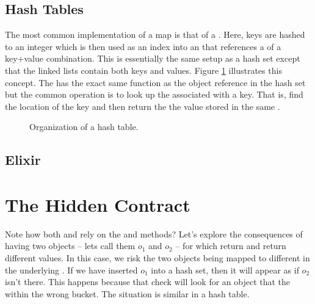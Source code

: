 \subsection{Hash Tables}

The most common implementation of a map is that of a . Here, keys are hashed to an integer which is then used as an index into an  that references a  of a key+value combination. This is essentially the same setup as a hash set except that the linked lists contain both keys and values. Figure \ref{fig:collections:hash:table} illustrates this concept. The  has the exact same function as the object reference in the hash set but the common operation is to look up the  associated with a key. That is, find the location of the key and then return the the value stored in the same .

\begin{figure}[tbp]
  
  \caption{Organization of a hash table.}
  \label{fig:collections:hash:table}
\end{figure}

\subsection{\csharp}
\subsection{Elixir}

\section{The Hidden Contract}

Note how both  and  rely on the  and  methods? Let's explore the consequences of having two objects -- lets call them $o_1$ and $o_2$ -- for which  return  and  return different values. In this case, we risk the two objects being mapped to different  in the underlying . If we have inserted $o_1$ into a hash set, then it will appear as if $o_2$ isn't there. This happens because that check will look for an object that  the   within the wrong bucket. The situation is similar in a hash table.

